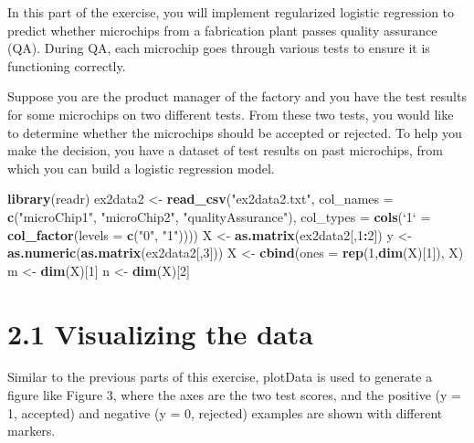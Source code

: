 \documentclass[
]{book}
\newenvironment{Shaded}{\begin{snugshade}}{\end{snugshade}}
\newcommand{\DataTypeTok}[1]{\textcolor[rgb]{0.13,0.29,0.53}{#1}}
\newcommand{\DecValTok}[1]{\textcolor[rgb]{0.00,0.00,0.81}{#1}}
\newcommand{\KeywordTok}[1]{\textcolor[rgb]{0.13,0.29,0.53}{\textbf{#1}}}
\newcommand{\NormalTok}[1]{#1}
\newcommand{\OperatorTok}[1]{\textcolor[rgb]{0.81,0.36,0.00}{\textbf{#1}}}
\newcommand{\StringTok}[1]{\textcolor[rgb]{0.31,0.60,0.02}{#1}}
\begin{document}
In this part of the exercise, you will implement regularized logistic regression to predict whether microchips from a fabrication plant passes quality assurance (QA). During QA, each microchip goes through various tests to ensure
it is functioning correctly.

Suppose you are the product manager of the factory and you have the test results for some microchips on two different tests. From these two tests, you would like to determine whether the microchips should be accepted or rejected. To help you make the decision, you have a dataset of test results on past microchips, from which you can build a logistic regression model.

\begin{Shaded}
\begin{Highlighting}[]
\KeywordTok{library}\NormalTok{(readr)}
\NormalTok{ex2data2 <-}\StringTok{ }\KeywordTok{read_csv}\NormalTok{(}\StringTok{"ex2data2.txt"}\NormalTok{, }
    \DataTypeTok{col_names =} \KeywordTok{c}\NormalTok{(}\StringTok{"microChip1"}\NormalTok{, }\StringTok{"microChip2"}\NormalTok{, }\StringTok{"qualityAssurance"}\NormalTok{),}
    \DataTypeTok{col_types =} \KeywordTok{cols}\NormalTok{(}\StringTok{`}\DataTypeTok{1}\StringTok{`}\NormalTok{ =}\StringTok{ }\KeywordTok{col_factor}\NormalTok{(}\DataTypeTok{levels =} \KeywordTok{c}\NormalTok{(}\StringTok{"0"}\NormalTok{, }
        \StringTok{"1"}\NormalTok{))))}
\NormalTok{X  <-}\StringTok{ }\KeywordTok{as.matrix}\NormalTok{(ex2data2[,}\DecValTok{1}\OperatorTok{:}\DecValTok{2}\NormalTok{])}
\NormalTok{y <-}\StringTok{ }\KeywordTok{as.numeric}\NormalTok{(}\KeywordTok{as.matrix}\NormalTok{(ex2data2[,}\DecValTok{3}\NormalTok{]))}
\NormalTok{X <-}\StringTok{ }\KeywordTok{cbind}\NormalTok{(}\DataTypeTok{ones =} \KeywordTok{rep}\NormalTok{(}\DecValTok{1}\NormalTok{,}\KeywordTok{dim}\NormalTok{(X)[}\DecValTok{1}\NormalTok{]), X)}
\NormalTok{m <-}\StringTok{ }\KeywordTok{dim}\NormalTok{(X)[}\DecValTok{1}\NormalTok{]}
\NormalTok{n <-}\StringTok{ }\KeywordTok{dim}\NormalTok{(X)[}\DecValTok{2}\NormalTok{]}
\end{Highlighting}
\end{Shaded}

\hypertarget{visualizing-the-data-1}{%
\section{2.1 Visualizing the data}\label{visualizing-the-data-1}}

Similar to the previous parts of this exercise, plotData is used to generate a figure like Figure 3, where the axes are the two test scores, and the positive (y = 1, accepted) and negative (y = 0, rejected) examples are shown with different markers.
\end{document}
